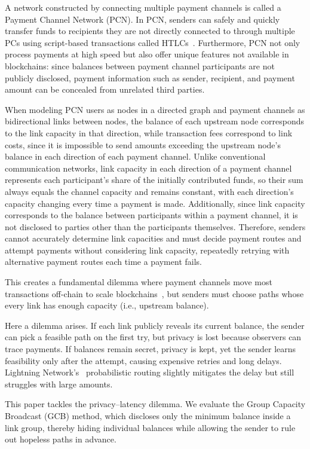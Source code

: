 \documentclass[conference]{IEEEtran}
\begin{document}
A network constructed by connecting multiple payment channels is called a Payment Channel Network (PCN). In PCN, senders can safely and quickly transfer funds to recipients they are not directly connected to through multiple PCs using script-based transactions called HTLCs~\cite{poon_dryja_2016}. Furthermore, PCN not only process payments at high speed but also offer unique features not available in blockchains: since balances between payment channel participants are not publicly disclosed, payment information such as sender, recipient, and payment amount can be concealed from unrelated third parties.

When modeling PCN users as nodes in a directed graph and payment channels as bidirectional links between nodes, the balance of each upstream node corresponds to the link capacity in that direction, while transaction fees correspond to link costs, since it is impossible to send amounts exceeding the upstream node's balance in each direction of each payment channel. Unlike conventional communication networks, link capacity in each direction of a payment channel represents each participant's share of the initially contributed funds, so their sum always equals the channel capacity and remains constant, with each direction's capacity changing every time a payment is made. Additionally, since link capacity corresponds to the balance between participants within a payment channel, it is not disclosed to parties other than the participants themselves. Therefore, senders cannot accurately determine link capacities and must decide payment routes and attempt payments without considering link capacity, repeatedly retrying with alternative payment routes each time a payment fails.

This creates a fundamental dilemma where payment channels move most transactions off-chain to scale blockchains~\cite{poon_dryja_2016}, but senders must choose paths whose every link has enough capacity (i.e., upstream balance).

Here a dilemma arises.  If each link publicly reveals its current balance, the sender can pick a feasible path on the first try, but privacy is lost because observers can trace payments.  If balances remain secret, privacy is kept, yet the sender learns feasibility only after the attempt, causing expensive retries and long delays.  Lightning Network's~\cite{lnbolt} probabilistic routing slightly mitigates the delay but still struggles with large amounts.

This paper tackles the privacy–latency dilemma.  We evaluate the Group Capacity Broadcast (GCB) method, which discloses only the minimum balance inside a link group, thereby hiding individual balances while allowing the sender to rule out hopeless paths in advance.
\end{document}

